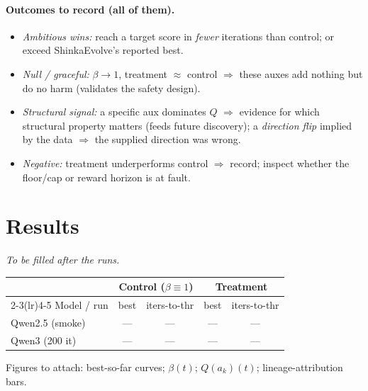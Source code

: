 \documentclass[11pt]{article}
\begin{document}
\paragraph{Outcomes to record (all of them).}
\begin{itemize}[nosep]
  \item \emph{Ambitious wins:} reach a target score in \emph{fewer} iterations than control; or exceed
        ShinkaEvolve's reported best.
  \item \emph{Null / graceful:} $\beta\to1$, treatment $\approx$ control $\Rightarrow$ these auxes
        add nothing but do no harm (validates the safety design).
  \item \emph{Structural signal:} a specific aux dominates $Q$ $\Rightarrow$ evidence for which
        structural property matters (feeds future discovery); a \emph{direction flip} implied by the
        data $\Rightarrow$ the supplied direction was wrong.
  \item \emph{Negative:} treatment underperforms control $\Rightarrow$ record; inspect whether the
        floor/cap or reward horizon is at fault.
\end{itemize}

\section{Results}
\emph{To be filled after the runs.}
\begin{table}[h]\centering\small
\begin{tabular}{@{}l cc cc@{}}
\toprule
& \multicolumn{2}{c}{Control ($\beta{\equiv}1$)} & \multicolumn{2}{c}{Treatment} \\
\cmidrule(lr){2-3}\cmidrule(lr){4-5}
Model / run & best & iters-to-thr & best & iters-to-thr \\
\midrule
Qwen2.5 (smoke) & --- & --- & --- & --- \\
Qwen3 (200 it) & --- & --- & --- & --- \\
\bottomrule
\end{tabular}
\end{table}
\noindent Figures to attach: best-so-far curves; $\beta(t)$; $Q(a_k)(t)$; lineage-attribution bars.
\end{document}
